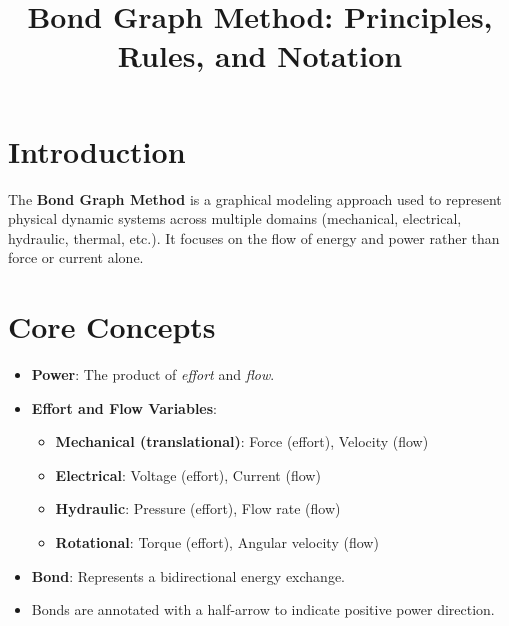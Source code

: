 \documentclass[12pt]{article}
\title{Bond Graph Method: Principles, Rules, and Notation}
\author{}
\date{}
\begin{document}
\maketitle

\section*{Introduction}
The \textbf{Bond Graph Method} is a graphical modeling approach used to represent physical dynamic systems across multiple domains (mechanical, electrical, hydraulic, thermal, etc.). It focuses on the flow of energy and power rather than force or current alone.

\section*{Core Concepts}
\begin{itemize}
    \item \textbf{Power}: The product of \textit{effort} and \textit{flow}.
    \item \textbf{Effort and Flow Variables}:
    \begin{itemize}
        \item \textbf{Mechanical (translational)}: Force (effort), Velocity (flow)
        \item \textbf{Electrical}: Voltage (effort), Current (flow)
        \item \textbf{Hydraulic}: Pressure (effort), Flow rate (flow)
        \item \textbf{Rotational}: Torque (effort), Angular velocity (flow)
    \end{itemize}
    \item \textbf{Bond}: Represents a bidirectional energy exchange.
    \item Bonds are annotated with a half-arrow to indicate positive power direction.
\end{itemize}
\end{document}
